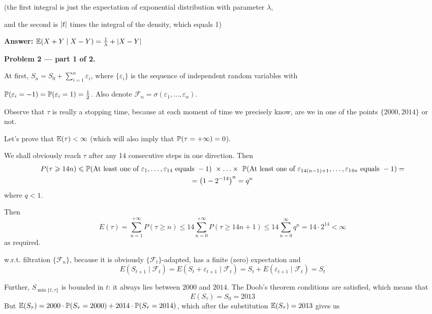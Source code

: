 \documentclass[12pt, a4paper]{article}
\newcommand{\cF}{\mathcal{F}}
\newcommand{\ee}{\varepsilon}
\DeclarePairedDelimiter{\abs}{\lvert}{\rvert}
\begin{document}
(the first integral is just the expectation of exponential distribution with parameter $\lambda$,\par and the second is $\abs{t}$ times the integral of the density, which equals 1)\[\]\par
\textbf{Answer:} $\E(X+Y \mid X-Y) = \frac{ 1}{ \lambda} + \abs{X-Y}$








\textbf{Problem 2 — part 1 of 2.}\par
At first, $S_{n} = S_{0}+\sum_{i = 1}^{n}\ee_{i}$, where $\{\ee_{i}\}$ is the sequence of independent random variables with\par
 $\P(\ee_{i} = -1) = \P(\ee_{i} = 1) = \frac{ 1}{ 2}$. Also denote $\cF_{n} = \sigma(\ee_{1},\ldots,\ee_{n})$.\par
Observe that $\tau$ is really a stopping time, because at each moment of time we precisely know, are we in one of the points $\{2000, 2014\}$ or not.\par

Let's prove that $\E(\tau) < \infty$ (which will also imply that $\P(\tau = +\infty) = 0$).\par
We shall obviously reach $\tau$ after any 14 consecutive steps in one direction.
Then
\begin{multline}
P(\tau \geqslant 14n) \leq  \P(\mbox{At least one of }\ee_{1},\ldots ,\ee_{14}\mbox{ equals } -1)\ \times \ldots \times\  \P(\mbox{At least one of }\ee_{14(n-1)+1},\ldots ,\ee_{14n}\mbox{ equals } -1) = \\
= \left(1 - 2^{-14}\right)^{n} = q^{n}
\end{multline}
where $q<1$.

Then
\[
E(\tau) = \sum_{n = 1}^{+\infty}P(\tau \geqslant n)  \leq  14\sum_{n = 0}^{+\infty}P(\tau \geqslant 14n+1) \leq  14\sum_{n = 0}^{\infty}q^{n} = 14\cdot 2^{14} < \infty
\]
as required.


 w.r.t. filtration $\{\cF_{n}\}$, because it is obviously $\{\cF_{t}\}$-adapted, has a finite (zero) expectation and
\[
E(S_{t+1} \mid \cF_{t}) = E(S_{t} + \ee_{t+1} \mid \cF_{t}) = S_{t} + E(\ee_{t+1} \mid \cF_{t}) = S_{t}
\]

Further, $S_{\min\{t, \tau\}}$ is bounded in $t$: it always lies between $2000$ and $2014$. The Doob's theorem conditions are satisfied, which means that
\[
E(S_{\tau}) = S_0 = 2013
\]
But $\E(S_{\tau}) = 2000\cdot \P(S_{\tau} = 2000) + 2014\cdot \P(S_{\tau} = 2014)$, which after the substitution $\E(S_{\tau}) = 2013$ gives us
\end{document}
